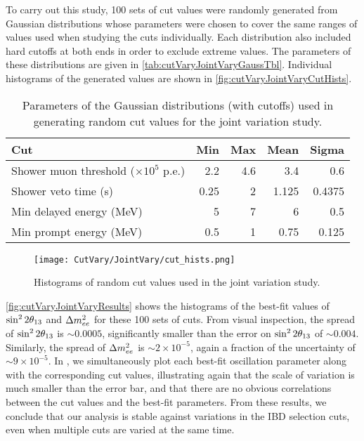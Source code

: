 \documentclass[../thesis.tex]{subfiles}
\begin{document}
To carry out this study, 100 sets of cut values were randomly generated from Gaussian distributions whose parameters were chosen to cover the same ranges of values used when studying the cuts individually. Each distribution also included hard cutoffs at both ends in order to exclude extreme values. The parameters of these distributions are given in \autoref{tab:cutVaryJointVaryGaussTbl}. Individual histograms of the generated values are shown in \autoref{fig:cutVaryJointVaryCutHists}.

\begin{table}[ht]
  \begin{tabular}{lrrrr}
    \toprule
    Cut & Min & Max & Mean & Sigma \\
    \midrule
    Shower muon threshold ($\times 10^5$ p.e.) & 2.2 & 4.6 & 3.4 & 0.6\\
    Shower veto time (s) & 0.25 & 2 & 1.125 & 0.4375\\
    Min delayed energy (MeV) & 5 & 7 & 6 & 0.5\\
    Min prompt energy (MeV) & 0.5 & 1 & 0.75 & 0.125\\
    \bottomrule
  \end{tabular}
  \caption{Parameters of the Gaussian distributions (with cutoffs) used in generating random cut values for the joint variation study.}
  \label{tab:cutVaryJointVaryGaussTbl}
\end{table}

\begin{figure}[h]
  \texttt{[image: CutVary/JointVary/cut\_hists.png]}
  \caption{Histograms of random cut values used in the joint variation study.}
  \label{fig:cutVaryJointVaryCutHists}
\end{figure}

\autoref{fig:cutVaryJointVaryResults} shows the histograms of the best-fit values of $\sin^2 2\theta_{13}$ and $\Delta m^2_{ee}$ for these 100 sets of cuts. From visual inspection, the spread of $\sin^2 2\theta_{13}$ is $\sim0.0005$, significantly smaller than the error on $\sin^2 2\theta_{13}$ of $\sim0.004$. Similarly, the spread of $\Delta m^2_{ee}$ is $\sim2\times10^{-5}$, again a fraction of the uncertainty of $\sim9\times10^{-5}$. In , we simultaneously plot each best-fit oscillation parameter along with the corresponding cut values, illustrating again that the scale of variation is much smaller than the error bar, and that there are no obvious correlations between the cut values and the best-fit parameters. From these results, we conclude that our analysis is stable against variations in the IBD selection cuts, even when multiple cuts are varied at the same time.
\end{document}
